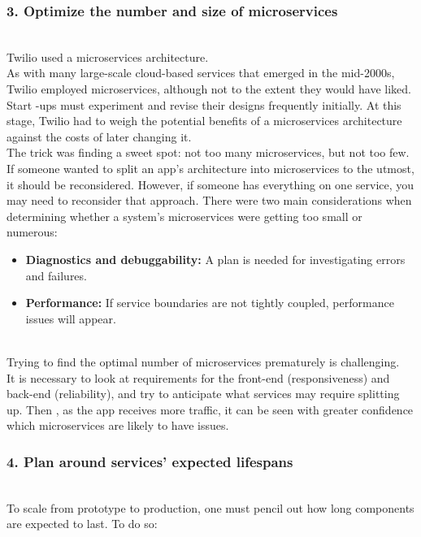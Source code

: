 \subsubsection{3. Optimize the number and size of microservices}\label{9ZV6VhjshzdXs-jcMHB2v}
\\
Twilio used a microservices architecture.
\\
As with many large-scale cloud-based services that emerged in the mid-2000s, Twilio employed microservices, although not to the extent they would have liked. Start -ups must experiment and revise their designs frequently initially. At this stage, Twilio had to weigh the potential benefits of a microservices architecture against the costs of later changing it.
\\
The trick was finding a sweet spot: not too many microservices, but not too few.
\\
If someone wanted to split an app's architecture into microservices to the utmost, it should be reconsidered. However, if someone has everything on one service, you may need to reconsider that approach\emph{.} There were two main considerations when determining whether a system's microservices were getting too small or numerous:

\begin{itemize}
\item
\protect{}\label{CZqaRwgBzYpLM_HuVulJ6}
\textbf{Diagnostics and debuggability:} A plan is needed for investigating errors and failures.
\item
\protect{}\label{gvybekyQUYfCuEG2IdwxO}
\textbf{Performance:} If service boundaries are not tightly coupled, performance issues will appear.
\end{itemize}
\\
Trying to find the optimal number of microservices prematurely is challenging.
\\
It is necessary to look at requirements for the front-end (responsiveness) and back-end (reliability), and try to anticipate what services may require splitting up. Then , as the app receives more traffic, it can be seen with greater confidence which microservices are likely to have issues.

\subsubsection{4. Plan around services' expected lifespans}\label{Xrt-D4gGWaCpNkfVf8Yly}
\\
To scale from prototype to production, one must pencil out how long components are expected to last. To do so:

